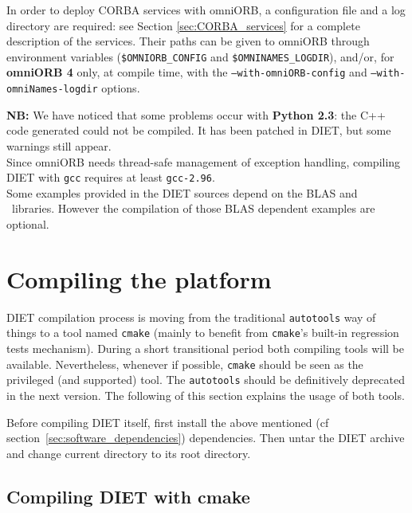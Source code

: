 In order to deploy CORBA services with omniORB, a configuration file
and a log directory are required: see Section
\ref{sec:CORBA_services} for a complete description of the services.
Their paths can be given to omniORB through environment variables
(\texttt{\$OMNIORB\_CONFIG} and \texttt{\$OMNINAMES\_LOGDIR}), and/or,
for \textbf{omniORB 4} only, at compile time, with the
\texttt{--with-omniORB-config} and \texttt{--with-omniNames-logdir}
options.

\noindent 
\textbf{NB:} We have noticed that some problems occur with
\textbf{Python 2.3}: the C++ code generated could not be compiled. It
has been patched in DIET, but some warnings still appear.  \\

Since omniORB needs thread-safe management of exception handling,
compiling DIET with \verb+gcc+ requires at least \verb+gcc-2.96+.  \\

Some examples provided in the DIET sources depend on the BLAS
and \scalapack\ libraries. However the compilation of those BLAS dependent
examples are optional.


\section{Compiling the platform}
\label{sec:compil_platform}

DIET compilation process is moving from the traditional \verb+autotools+
way of things to a tool named \verb+cmake+ (mainly to benefit from
\verb+cmake+'s built-in regression tests mechanism).
During a short transitional period both compiling tools will be available. 
Nevertheless, whenever if possible, \verb+cmake+ should be seen as the
privileged (and supported) tool.
The \verb+autotools+ should be definitively deprecated in the next version.
The following of this section explains the usage of both tools.

Before compiling DIET itself, first install the above mentioned
(cf section~\ref{sec:software_dependencies}) dependencies.
Then untar the DIET archive and change current directory to its root directory.

\subsection{Compiling DIET with cmake}

